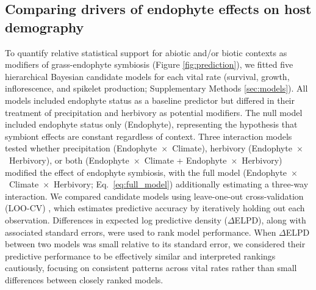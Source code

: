 \documentclass[12pt]{article}\usepackage[]{graphicx}\usepackage[dvipsnames]{xcolor}
\begin{document}
\subsection*{Comparing drivers of endophyte effects on host demography}
To quantify relative statistical support for abiotic and/or biotic contexts  as modifiers of grass-endophyte symbiosis (Figure \ref{fig:prediction}), we fitted five hierarchical Bayesian candidate models for each vital rate (survival, growth, inflorescence, and spikelet production; Supplementary Methods \ref{sec:models}).
All models included endophyte status as a baseline predictor but differed in their treatment of precipitation and herbivory as potential modifiers.
The null model included endophyte status only (Endophyte), representing the hypothesis that symbiont effects are constant regardless of context.
Three interaction models tested whether precipitation (Endophyte~$\times$~Climate), herbivory (Endophyte~$\times$~Herbivory), or both (Endophyte~$\times$~Climate + Endophyte~$\times$~Herbivory) modified the effect of endophyte symbiosis, with the full model (Endophyte~$\times$~Climate~$\times$~Herbivory; Eq.~\ref{eq:full_model}) additionally estimating a three-way interaction.
We compared candidate models using leave-one-out cross-validation (LOO-CV) \citep{vehtari2017practical}, which estimates predictive accuracy by iteratively holding out each observation.
Differences in expected log predictive density ($\Delta$ELPD), along with associated standard errors, were used to rank model performance.
When $\Delta$ELPD between two models was small relative to its standard error, we considered their predictive performance to be effectively similar and interpreted rankings cautiously, focusing on consistent patterns across vital rates rather than small differences between closely ranked models.
\end{document}
